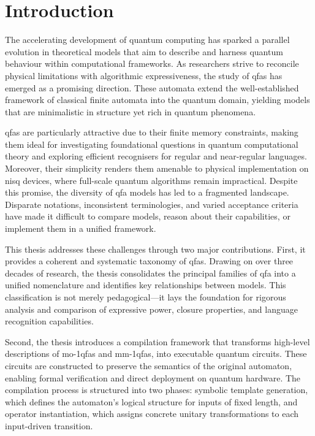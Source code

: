 \chapter{Introduction}
\label{chap:introduction}

The accelerating development of quantum computing has sparked a parallel evolution in theoretical models that aim to describe and harness quantum behaviour within computational frameworks. As researchers strive to reconcile physical limitations with algorithmic expressiveness, the study of \glspl{qfa} has emerged as a promising direction. These automata extend the well-established framework of classical finite automata into the quantum domain, yielding models that are minimalistic in structure yet rich in quantum phenomena.

\Glspl{qfa} are particularly attractive due to their finite memory constraints, making them ideal for investigating foundational questions in quantum computational theory and exploring efficient recognisers for regular and near-regular languages. Moreover, their simplicity renders them amenable to physical implementation on \gls{nisq} devices, where full-scale quantum algorithms remain impractical. Despite this promise, the diversity of \gls{qfa} models has led to a fragmented landscape. Disparate notations, inconsistent terminologies, and varied acceptance criteria have made it difficult to compare models, reason about their capabilities, or implement them in a unified framework.

This thesis addresses these challenges through two major contributions. First, it provides a coherent and systematic taxonomy of \glspl{qfa}. Drawing on over three decades of research, the thesis consolidates the principal families of \gls{qfa} into a unified nomenclature and identifies key relationships between models. This classification is not merely pedagogical—it lays the foundation for rigorous analysis and comparison of expressive power, closure properties, and language recognition capabilities.

Second, the thesis introduces a compilation framework that transforms high-level descriptions of \glspl{mo-1qfa} and \glspl{mm-1qfa}, into executable quantum circuits. These circuits are constructed to preserve the semantics of the original automaton, enabling formal verification and direct deployment on quantum hardware. The compilation process is structured into two phases: symbolic template generation, which defines the automaton’s logical structure for inputs of fixed length, and operator instantiation, which assigns concrete unitary transformations to each input-driven transition.

